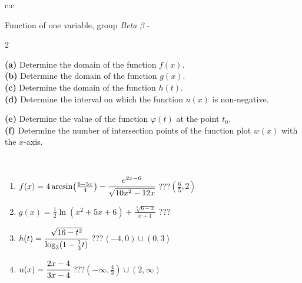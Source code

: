 \documentclass[10pt]{report}
\begin{document}
\begin{tabular}{c:c}
\begin{minipage}[c][104.5mm][t]{0.5\linewidth}
\begin{center}
\vspace{7mm}
{\huge Function of one variable, group \textit{Beta $\beta$} -}\\[5mm]
\begin{minipage}{0.95\linewidth}
\begin{center}
{\small \begin{multicols}{2} \raggedright
\textbf{(a)} Determine the domain of the function \(f(x)\). \\[1mm]
\textbf{(b)} Determine the domain of the function \(g(x)\). \\[1mm]
\textbf{(c)} Determine the domain of the function \(h(t)\). \\[1mm]
\textbf{(d)} Determine the interval on which the function \(u(x)\) is non-negative. \par \columnbreak
\textbf{(e)} Determine the value of the function \(\varphi(t)\) at the point \(t_0\). \\[1mm]
\textbf{(f)} Determine the number of intersection points of the function plot \(w(x)\) with the \(x\)-axis. \\[1mm]
\end{multicols}
}
\end{center}
\end{minipage}
\\[4mm]
\begin{minipage}{0.79\linewidth}
\begin{center}
\begin{varwidth}{\linewidth}
\begin{enumerate}
\small
\item $f(x) = 4\arcsin\!\left( \frac{6-5x}{4} \right) - \cfrac{e^{2x-6}}{\sqrt{10x^2-12x}}$\quad \dotfill\; ???\;\dotfill \quad $\left(\frac{6}{5} , 2\right\rangle$
\item $g(x) = \frac{1}{2} \ln{\!(x^2+5x+6)}+\frac{\sqrt[3]{6-x}}{x+1}$\quad \dotfill\; ???\;\dotfill {}
\item $h(t) = \cfrac{\sqrt{16-t^2}}{\log_3(1-\frac{1}{3}t)}$\quad \dotfill\; ???\;\dotfill \quad $\left\langle-4 , 0\right)\cup\left(0 , 3\right\rangle$
\item $u(x) = \cfrac{2x-4}{3x-4}$\quad \dotfill\; ???\;\dotfill \quad $\left(-\infty , \frac{4}{3}\right)\cup\left(2 , \infty\right)$

\end{enumerate}
\end{varwidth}
\end{center}
\end{minipage}
\end{center}
\end{minipage}
\end{tabular}
\end{document}
